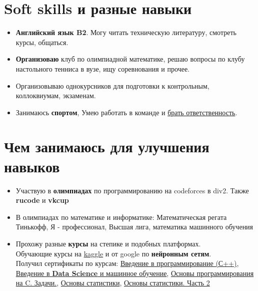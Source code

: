 \documentclass[a4paper,12pt]{article}
\begin{document}
\section{Soft skills и разные навыки}
\begin{itemize}
    \item \textbf{Английский язык B2}. Могу читать техническую литературу, смотреть курсы, общаться.
    \item \textbf{Организоваю} клуб по олимпиадной математике, решаю вопросы по клубу настольного тенниса в вузе, ищу соревнования и прочее.
    \item Организовываю однокурсников для подготовки к контрольным, коллоквиумам, экзаменам.
    \item Занимаюсь \textbf{спортом}, Умею работать в команде и \underline{брать ответственность}.
\end{itemize}

\section{Чем занимаюсь для улучшения навыков}
\begin{itemize}
    \item Участвую в \textbf{олимпиадах} по программированию на codeforces в div2. Также \textbf{rucode} и \textbf{vkcup}
    \item В олимпиадах по математике и информатике: Математическая регата Тинькофф, Я - профессионал, Высшая лига, математика машинного обучения

    \item Прохожу разные \textbf{курсы} на степике и подобных платформах.
    \\ Обучающие курсы на \underline{kaggle} и от google по \textbf{нейронным сетям}.
    \\Получил сертификаты по курсам:        \href{https://stepik.org/course/363/syllabus}{Введение в программирование (С++)}, \href{https://stepik.org/course/4852/syllabus}{Введение в \textbf{Data Science} и машинное обучение},          \href{https://stepik.org/course/3078/syllabus}{Основы программирования на C. Задачи.}, \href{https://stepik.org/course/76/syllabus}{Основы статистики}, \href{https://stepik.org/course/524/syllabus}{Основы статистики. Часть 2}    
\end{itemize}
\end{document}
